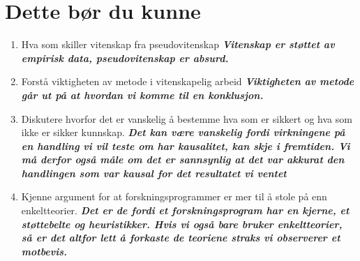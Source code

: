 \documentclass[11pt]{article}
\begin{document}
\section{Dette bør du kunne}
\begin{enumerate}
    \item Hva som skiller vitenskap fra pseudovitenskap
    \textbf{\textit{Vitenskap er støttet av empirisk data, pseudovitenskap er absurd. }}
    \item Forstå viktigheten av metode i vitenskapelig arbeid
    \textbf{\textit{Viktigheten av metode går ut på at hvordan vi komme til en konklusjon. }}
    \item Diskutere hvorfor det er vanskelig å bestemme hva som er sikkert og hva som ikke er sikker kunnskap. 
    \textbf{\textit{Det kan være vanskelig fordi virkningene på en handling vi vil teste om har kausalitet, kan skje i fremtiden. Vi må derfor også måle om det er sannsynlig at det var akkurat den handlingen som var kausal for det resultatet vi ventet}}
    \item Kjenne argument for at forskningsprogrammer er mer til å stole på enn enkeltteorier. 
    \textbf{\textit{Det er de fordi et forskningsprogram har en kjerne, et støttebelte og heuristikker. Hvis vi også bare bruker enkeltteorier, så er det altfor lett å forkaste de teoriene straks vi observerer et motbevis.}}
\end{enumerate}
\end{document}
